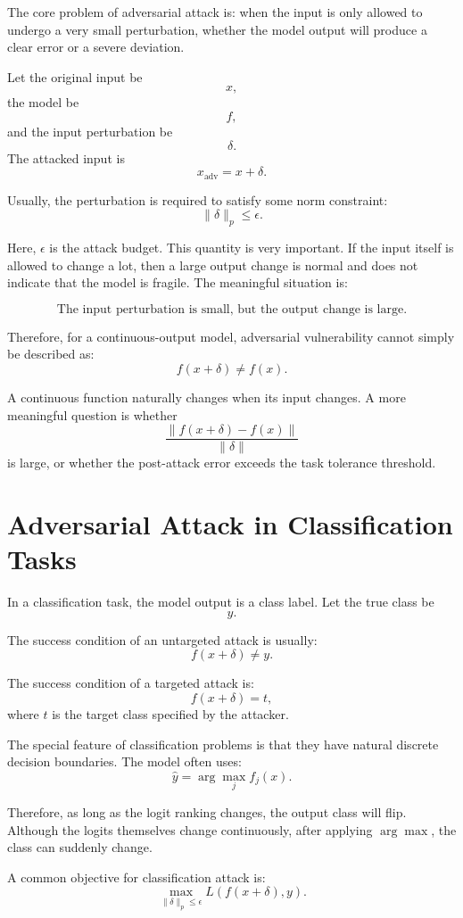 \documentclass{article}
\begin{document}
The core problem of adversarial attack is: when the input is only allowed to undergo a very small perturbation, whether the model output will produce a clear error or a severe deviation.

Let the original input be
\[
x,
\]
the model be
\[
f,
\]
and the input perturbation be
\[
\delta.
\]
The attacked input is
\[
x_{\mathrm{adv}}=x+\delta.
\]

Usually, the perturbation is required to satisfy some norm constraint:
\[
\|\delta\|_p\leq \epsilon.
\]

Here, \(\epsilon\) is the attack budget. This quantity is very important. If the input itself is allowed to change a lot, then a large output change is normal and does not indicate that the model is fragile. The meaningful situation is:

\[
\text{The input perturbation is small, but the output change is large.}
\]

Therefore, for a continuous-output model, adversarial vulnerability cannot simply be described as:
\[
f(x+\delta)\neq f(x).
\]

A continuous function naturally changes when its input changes. A more meaningful question is whether
\[
\frac{\|f(x+\delta)-f(x)\|}{\|\delta\|}
\]
is large, or whether the post-attack error exceeds the task tolerance threshold.

\section{Adversarial Attack in Classification Tasks}

In a classification task, the model output is a class label. Let the true class be
\[
y.
\]

The success condition of an untargeted attack is usually:
\[
f(x+\delta)\neq y.
\]

The success condition of a targeted attack is:
\[
f(x+\delta)=t,
\]
where \(t\) is the target class specified by the attacker.

The special feature of classification problems is that they have natural discrete decision boundaries. The model often uses:
\[
\hat y=\arg\max_j f_j(x).
\]

Therefore, as long as the logit ranking changes, the output class will flip. Although the logits themselves change continuously, after applying \(\arg\max\), the class can suddenly change.

A common objective for classification attack is:
\[
\max_{\|\delta\|_p\leq \epsilon}
L(f(x+\delta),y).
\]
\end{document}

